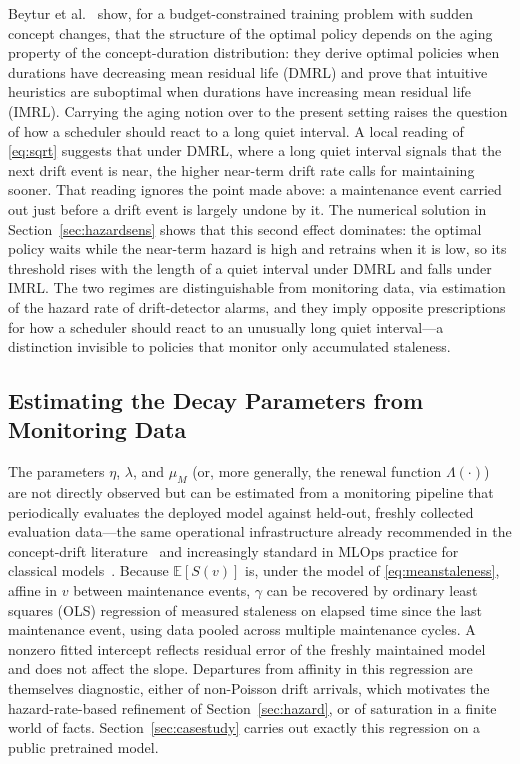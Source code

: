 \documentclass[electronics,article,submit,pdftex,moreauthors]{Definitions/mdpi}
\newcommand{\E}{\mathbb{E}}
\begin{document}
Beytur et al.~\cite{Beytur2025} show, for a budget-constrained training problem with sudden concept changes, that the structure of the optimal policy depends on the aging property of the concept-duration distribution: they derive optimal policies when durations have decreasing mean residual life (DMRL) and prove that intuitive heuristics are suboptimal when durations have increasing mean residual life (IMRL). Carrying the aging notion over to the present setting raises the question of how a scheduler should react to a long quiet interval. A local reading of \eqref{eq:sqrt} suggests that under DMRL, where a long quiet interval signals that the next drift event is near, the higher near-term drift rate calls for maintaining sooner. That reading ignores the point made above: a maintenance event carried out just before a drift event is largely undone by it. The numerical solution in Section~\ref{sec:hazardsens} shows that this second effect dominates: the optimal policy waits while the near-term hazard is high and retrains when it is low, so its threshold rises with the length of a quiet interval under DMRL and falls under IMRL. The two regimes are distinguishable from monitoring data, via estimation of the hazard rate of drift-detector alarms, and they imply opposite prescriptions for how a scheduler should react to an unusually long quiet interval---a distinction invisible to policies that monitor only accumulated staleness.

\subsection{Estimating the Decay Parameters from Monitoring Data}\label{sec:estimation}

The parameters $\eta$, $\lambda$, and $\mu_M$ (or, more generally, the renewal function $\Lambda(\cdot)$) are not directly observed but can be estimated from a monitoring pipeline that periodically evaluates the deployed model against held-out, freshly collected evaluation data---the same operational infrastructure already recommended in the concept-drift literature~\cite{Lu2019} and increasingly standard in MLOps practice for classical models~\cite{Mahadevan2023,PoenaruOlaru2025}. Because $\E[S(v)]$ is, under the model of \eqref{eq:meanstaleness}, affine in $v$ between maintenance events, $\gamma$ can be recovered by ordinary least squares (OLS) regression of measured staleness on elapsed time since the last maintenance event, using data pooled across multiple maintenance cycles. A nonzero fitted intercept reflects residual error of the freshly maintained model and does not affect the slope. Departures from affinity in this regression are themselves diagnostic, either of non-Poisson drift arrivals, which motivates the hazard-rate-based refinement of Section~\ref{sec:hazard}, or of saturation in a finite world of facts. Section~\ref{sec:casestudy} carries out exactly this regression on a public pretrained model.
\end{document}
